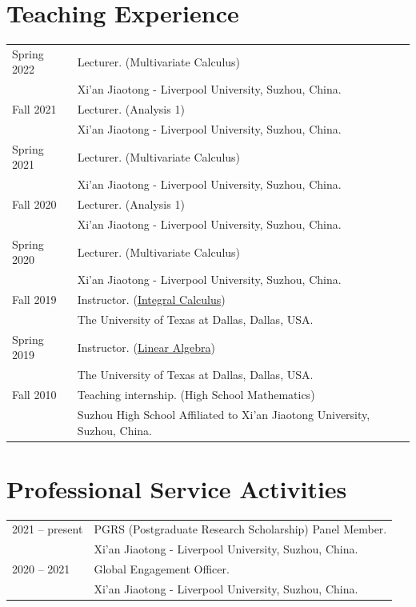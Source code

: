 \documentclass[a4paper,12pt]{article}
\begin{document}
\section*{\Large{Teaching Experience}}
\begin{tabular}{@{}p{1.4in}p{4in}} 
Spring 2022 & Lecturer. (Multivariate Calculus) \\
             & Xi'an Jiaotong - Liverpool University, Suzhou, China.   \\
Fall 2021 & Lecturer. (Analysis 1) \\
               & Xi'an Jiaotong - Liverpool University, Suzhou, China.   \\
Spring 2021 & Lecturer. (Multivariate Calculus) \\
             & Xi'an Jiaotong - Liverpool University, Suzhou, China.   \\
Fall 2020 & Lecturer. (Analysis 1) \\
               & Xi'an Jiaotong - Liverpool University, Suzhou, China.   \\
Spring 2020 & Lecturer. (Multivariate Calculus) \\
             & Xi'an Jiaotong - Liverpool University, Suzhou, China.   \\
Fall 2019 & Instructor. (\href{https://yzhang1616.github.io/calculus19fall/calculus.html}{Integral Calculus}) \\
             & The University of Texas at Dallas, Dallas, USA.   \\
Spring 2019           & Instructor. (\href{https://yzhang1616.github.io/algebra19spring/algebra.html}{Linear Algebra}) \\
                      & The University of Texas at Dallas, Dallas, USA. \\
Fall 2010             & Teaching internship. (High School Mathematics) \\
                      & Suzhou High School Affiliated to Xi'an Jiaotong University, Suzhou, China.                        
\end{tabular}

\section*{\Large{Professional Service Activities}}
\begin{tabular}{@{}p{1.4in}p{4in}} 
2021 -- present & PGRS (Postgraduate Research Scholarship) Panel Member. \\
                           & Xi'an Jiaotong - Liverpool University, Suzhou, China.  \\
2020 -- 2021 & Global Engagement Officer. \\
             & Xi'an Jiaotong - Liverpool University, Suzhou, China.                  
\end{tabular}
\end{document}
